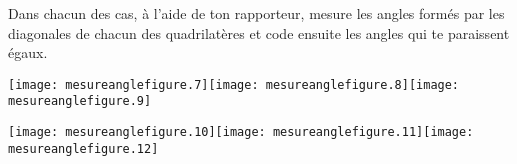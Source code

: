 Dans chacun des cas, à l'aide de ton rapporteur, mesure les angles formés par les diagonales de chacun des quadrilatères et code ensuite les angles qui te paraissent égaux.
\par
\texttt{[image: mesureanglefigure.7]}\hfill\texttt{[image: mesureanglefigure.8]}\hfill\texttt{[image: mesureanglefigure.9]}
\par
\texttt{[image: mesureanglefigure.10]}\hfill\texttt{[image: mesureanglefigure.11]}\hfill\texttt{[image: mesureanglefigure.12]}
